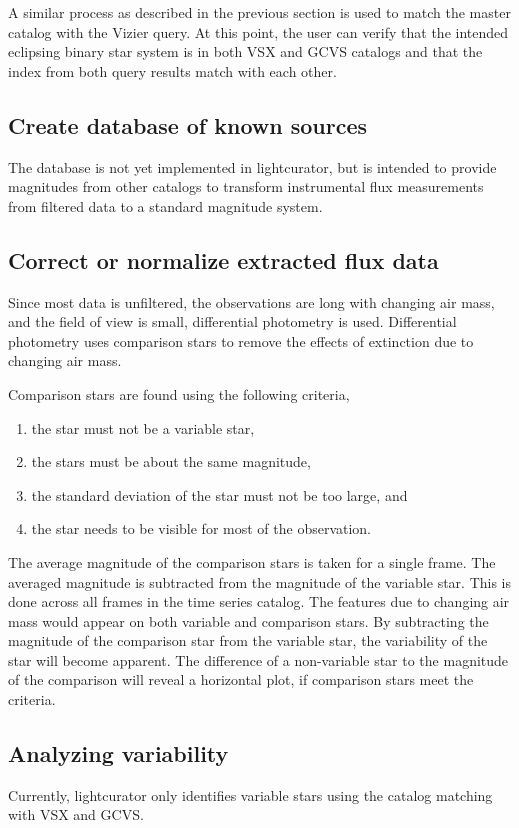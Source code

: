 A similar process as described in the previous section is used to match
the master catalog with the Vizier query.
At this point, the user can verify that the intended eclipsing binary 
star system is in both VSX and GCVS catalogs and that the index
from both query results match with each other.

\subsection{Create database of known sources}
The database is not yet implemented in lightcurator, but is intended to 
provide magnitudes from other catalogs to transform instrumental
flux measurements from filtered data to a standard magnitude system.

\subsection{Correct or normalize extracted flux data}
Since most data is unfiltered, the observations are long with changing
air mass, and the field of view is small, differential photometry is used.
Differential photometry uses comparison stars to remove the effects of
extinction due to changing air mass.

Comparison stars are found using the following criteria, 
\begin{enumerate}
    \item the star must not be a variable star,
    \item the stars must be about the same magnitude,
    \item the standard deviation of the star must not be too large, and
    \item the star needs to be visible for most of the observation.
\end{enumerate}

The average magnitude of the comparison stars is taken for a single frame.
The averaged magnitude is subtracted from the magnitude of the variable star.
This is done across all frames in the time series catalog.
The features due to changing air mass would appear on both variable and 
comparison stars.
By subtracting the magnitude of the comparison star from the
variable star, the variability of the star will become apparent. 
The difference of a non-variable star to the magnitude of the comparison
will reveal a horizontal plot, if comparison stars meet the criteria. 

\subsection{Analyzing variability}
Currently, lightcurator only identifies variable stars using the catalog
matching with VSX and GCVS\@. 

